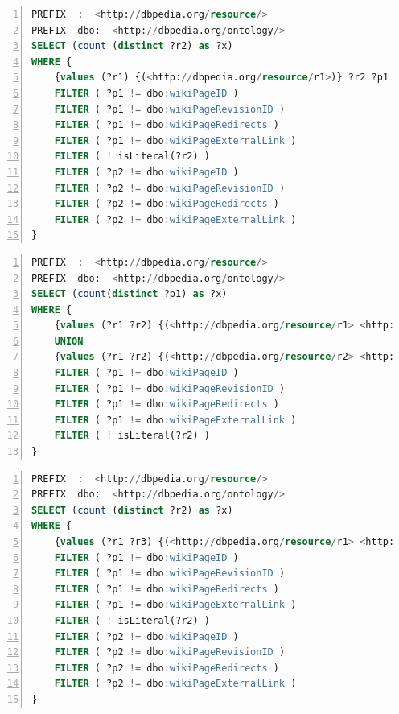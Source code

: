 \begin{lstlisting}[caption=Consulta SPARQL para contagem de links indiretos., language=SQL, frame=single, label={cod:sparql_ci}, float, numbers=left]
PREFIX  :  <http://dbpedia.org/resource/>
PREFIX  dbo:  <http://dbpedia.org/ontology/>
SELECT (count (distinct ?r2) as ?x)
WHERE {
	{values (?r1) {(<http://dbpedia.org/resource/r1>)} ?r2 ?p1 ?r1 . ?r2 ?p2 ?r3 . FILTER (?r1 != ?r3 && ?r2 != ?r1 && ?r2 != ?r3)}
	FILTER ( ?p1 != dbo:wikiPageID )
	FILTER ( ?p1 != dbo:wikiPageRevisionID )
	FILTER ( ?p1 != dbo:wikiPageRedirects )
	FILTER ( ?p1 != dbo:wikiPageExternalLink )
	FILTER ( ! isLiteral(?r2) )
	FILTER ( ?p2 != dbo:wikiPageID )
	FILTER ( ?p2 != dbo:wikiPageRevisionID )
	FILTER ( ?p2 != dbo:wikiPageRedirects )
	FILTER ( ?p2 != dbo:wikiPageExternalLink )
}
\end{lstlisting}

\begin{lstlisting}[caption=Consulta SPARQL para contagem de links diretos (saíntes e entrantes) entre dois recursos., language=SQL, frame=single, label={cod:sparql_cdio}, float, numbers=left]
PREFIX  :  <http://dbpedia.org/resource/>
PREFIX  dbo:  <http://dbpedia.org/ontology/>
SELECT (count(distinct ?p1) as ?x)
WHERE {
	{values (?r1 ?r2) {(<http://dbpedia.org/resource/r1> <http://dbpedia.org/resource/France>)} ?r1 ?p1 ?r2 . FILTER (?r1 != ?r2) }
	UNION
	{values (?r1 ?r2) {(<http://dbpedia.org/resource/r2> <http://dbpedia.org/resource/Paris>)} ?r1 ?p1 ?r2 . FILTER (?r1 != ?r2) }
	FILTER ( ?p1 != dbo:wikiPageID )
	FILTER ( ?p1 != dbo:wikiPageRevisionID )
	FILTER ( ?p1 != dbo:wikiPageRedirects )
	FILTER ( ?p1 != dbo:wikiPageExternalLink )
	FILTER ( ! isLiteral(?r2) )
}
\end{lstlisting}

\begin{lstlisting}[caption=Consulta SPARQL para contagem de links indiretos (saíntes) entre dois recursos., language=SQL, frame=single, label={cod:sparql_cio}, float, numbers=left]
PREFIX  :  <http://dbpedia.org/resource/>
PREFIX  dbo:  <http://dbpedia.org/ontology/>
SELECT (count (distinct ?r2) as ?x)
WHERE {
	{values (?r1 ?r3) {(<http://dbpedia.org/resource/r1> <http://dbpedia.org/resource/r2>)} ?r2 ?p1 ?r1 . ?r2 ?p2 ?r3 . FILTER (?r1 != ?r3 && ?r2 != ?r1 && ?r2 != ?r3)}
	FILTER ( ?p1 != dbo:wikiPageID )
	FILTER ( ?p1 != dbo:wikiPageRevisionID )
	FILTER ( ?p1 != dbo:wikiPageRedirects )
	FILTER ( ?p1 != dbo:wikiPageExternalLink )
	FILTER ( ! isLiteral(?r2) )
	FILTER ( ?p2 != dbo:wikiPageID )
	FILTER ( ?p2 != dbo:wikiPageRevisionID )
	FILTER ( ?p2 != dbo:wikiPageRedirects )
	FILTER ( ?p2 != dbo:wikiPageExternalLink )
}
\end{lstlisting}


